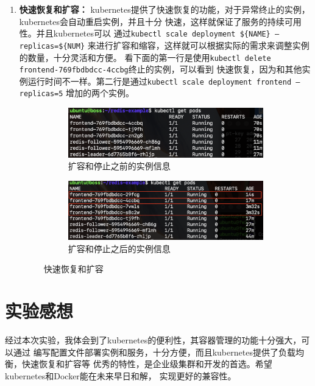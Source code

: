 \documentclass{article}
\begin{document}
\begin{enumerate}
\item {\textbf{\heiti 快速恢复和扩容：}}
kubernetes提供了快速恢复的功能，对于异常终止的实例，kubernetes会自动重启实例，并且十分
快速，这样就保证了服务的持续可用性。并且kubernetes可以
通过\texttt{kubectl scale deployment \$\{NAME\} --replicas=\$\{NUM\}}
来进行扩容和缩容，这样就可以根据实际的需求来调整实例的数量，十分灵活和方便。
看下面的第一行是使用\texttt{kubectl delete frontend-769fbdbdcc-4ccbg}终止的实例，可以看到
快速恢复，因为和其他实例运行时间不一样。第二行是通过\texttt{kubectl scale deployment frontend --replicas=5}
增加的两个实例。
\begin{figure}[H]
    \begin{subfigure}[b]{0.45\textwidth}
        \centering
        \includegraphics[width=\textwidth]{cos1.png}
        \caption{扩容和停止之前的实例信息}
        \label{fig:cos1}
    \end{subfigure}
    \hfill
    \begin{subfigure}[b]{0.50\textwidth}
        \centering
        \includegraphics[width=\textwidth]{cos2.png}
        \caption{扩容和停止之后的实例信息}
        \label{fig:cos2}
    \end{subfigure}
    \caption{快速恢复和扩容}
\end{figure}
\end{enumerate}
\section{实验感想}
经过本次实验，我体会到了kubernetes的便利性，其容器管理的功能十分强大，可以通过
编写配置文件部署实例和服务，十分方便，而且kubernetes提供了负载均衡，快速恢复和扩容等
优秀的特性，是企业级集群和开发的首选。希望kubernetes和Docker能在未来早日和解，
实现更好的兼容性。
\end{document}
